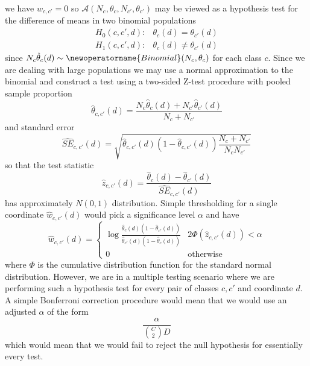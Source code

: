 \documentclass{article}
\begin{document}
we have $w_{c,c'}=0$ so $\mathcal{A}(N_c,\theta_c,N_{c'},\theta_{c'})$ may be viewed as a hypothesis test for the difference of means in
two binomial populations
\begin{align*}
H_0(c,c',d)\colon& \theta_c(d)=\theta_{c'}(d)\\
H_1(c,c',d)\colon& \theta_c(d)\neq \theta_{c'}(d)
\end{align*}
since 
$N_c\hat{\theta}_c(d)\sim\newoperatorname{Binomial}(N_c,\theta_c)$
for each class $c$.
Since we are dealing with large populations we may use a normal
approximation to the binomial and construct a test using
a two-sided Z-test procedure with pooled sample proportion
\begin{equation}
\hat{\theta}_{c,c'}(d) = \frac{N_c\hat{\theta}_c(d) +N_{c'}\hat{\theta}_{c'}(d) }{N_c+N_{c'}}
\end{equation}
and standard error
\begin{equation}
\hat{SE}_{c,c'}(d) = \sqrt{ \hat{\theta}_{c,c'}(d) (1-\hat{\theta}_{c,c'}(d))
\frac{N_c+N_{c'}}{N_cN_{c'}}}
\end{equation}
so that the test statistic
\begin{equation}
\hat{z}_{c,c'}(d) = \frac{\hat{\theta}_c(d) - \hat{\theta}_{c'}(d)}{\hat{SE}_{c,c'}(d)}
\end{equation}
has approximately $N(0,1)$ distribution. Simple thresholding for
a single coordinate $\hat{w}_{c,c'}(d)$ would pick a significance
level $\alpha$ and have
\begin{equation}
\hat{w}_{c,c'}(d) = \begin{cases}
\log\frac{\hat{\theta}_c(d)(1-\hat{\theta}_{c'}(d))}{\hat{\theta}_{c'}(d)(1-\hat{\theta}_c(d))} & 2\Phi(\hat{z}_{c,c'}(d))< \alpha\\
0 & \text{otherwise}
\end{cases}
\end{equation}
where $\Phi$ is the cumulative distribution function for the 
standard normal distribution. However, we are in a multiple
testing scenario where we are performing such a hypothesis test
for every pair of classes $c,c'$ and coordinate $d$.  A simple
Bonferroni correction procedure would mean that we would use
an adjusted $\alpha$ of the form
\begin{equation}
\frac{\alpha}{{C \choose 2} D}
\end{equation}
which would mean that we would fail to reject the null
hypothesis for essentially every test.
\end{document}
